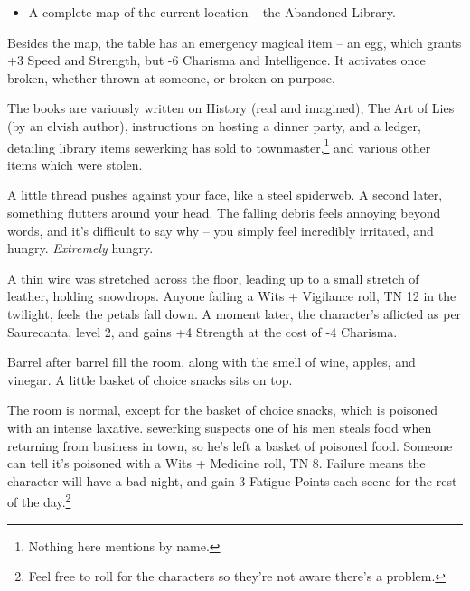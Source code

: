 \begin{multicols}{2}
\begin{itemize}
	\item{A complete map of the current location -- the Abandoned Library.}

\end{itemize}

Besides the map, the table has an emergency magical item -- an egg, which grants +3 Speed and Strength, but -6 Charisma and Intelligence.
It activates once broken, whether thrown at someone, or broken on purpose.

The books are variously written on History (real and imagined), The Art of Lies (by an elvish author), instructions on hosting a dinner party, and a ledger, detailing library items \gls{sewerking} has sold to \gls{townmaster},\footnote{Nothing here mentions  by name.} and various other items which were stolen.


\begin{boxtext}

	A little thread pushes against your face, like a steel spiderweb.
	A second later, something flutters around your head.
	The falling debris feels annoying beyond words, and it's difficult to say why -- you simply feel incredibly irritated, and hungry.
	\emph{Extremely} hungry.

\end{boxtext}

A thin wire was stretched across the floor, leading up to a small stretch of leather, holding snowdrops.  Anyone failing a Wits + Vigilance roll, TN 12 in the twilight, feels the petals fall down.  A moment later, the character's aflicted as per Saurecanta, level 2, and gains +4 Strength at the cost of -4 Charisma.


\begin{boxtext}

	Barrel after barrel fill the room, along with the smell of wine, apples, and vinegar.  A little basket of choice snacks sits on top.

\end{boxtext}

The room is normal, except for the basket of choice snacks, which is poisoned with an intense laxative.  \Gls{sewerking} suspects one of his men steals food when returning from business in town, so he's left a basket of poisoned food.  Someone can tell it's poisoned with a Wits + Medicine roll, TN 8.  Failure means the character will have a bad night, and gain 3 Fatigue Points each scene for the rest of the day.\footnote{Feel free to roll for the characters so they're not aware there's a problem.}


\end{multicols}
